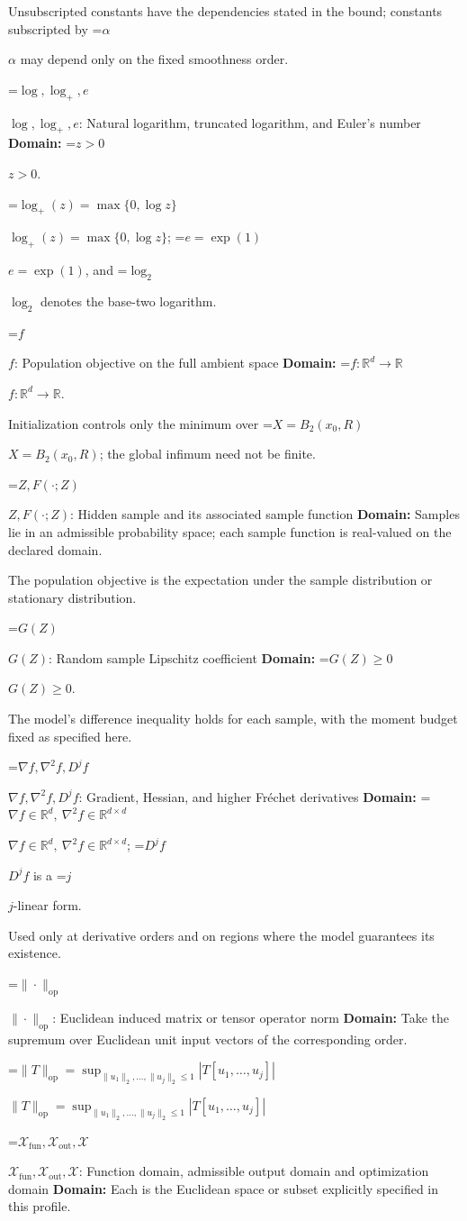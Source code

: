 \documentclass[10pt,a4paper]{article}
\newcommand{\AtlasMath}[1]{\par\begingroup\centering\setbox0=\hbox{$\displaystyle #1$}\ifdim\wd0>1.4\linewidth\typeout{ATLAS WIDE FORMULA: \the\wd0}\fi\ifdim\wd0>\linewidth\resizebox{\linewidth}{!}{\box0}\else\box0\fi\par\endgroup}
\newcommand{\AtlasInlineMath}[1]{\begingroup\setbox0=\hbox{$#1$}\ifdim\wd0>.4\linewidth\endgroup\AtlasMath{#1}\else\endgroup$#1$\fi}
\begin{document}
Unsubscripted constants have the dependencies stated in the bound; constants subscripted by \AtlasInlineMath{\alpha} may depend only on the fixed smoothness order.

\AtlasInlineMath{\log,\log_+,e}: Natural logarithm, truncated logarithm, and Euler's number \textbf{Domain:} \AtlasInlineMath{z>0}.

\AtlasInlineMath{\log_+(z)=\max\{0,\log z\}}; \AtlasInlineMath{e=\exp(1)}, and \AtlasInlineMath{\log_2} denotes the base-two logarithm.

\AtlasInlineMath{f}: Population objective on the full ambient space \textbf{Domain:} \AtlasInlineMath{f:\mathbb{R}^d\to\mathbb{R}}.

Initialization controls only the minimum over \AtlasInlineMath{X=B_2(x_0,R)}; the global infimum need not be finite.

\AtlasInlineMath{Z,F(\cdot;Z)}: Hidden sample and its associated sample function \textbf{Domain:} Samples lie in an admissible probability space; each sample function is real-valued on the declared domain.

The population objective is the expectation under the sample distribution or stationary distribution.

\AtlasInlineMath{G(Z)}: Random sample Lipschitz coefficient \textbf{Domain:} \AtlasInlineMath{G(Z)\ge0}.

The model's difference inequality holds for each sample, with the moment budget fixed as specified here.

\AtlasInlineMath{\nabla f,\nabla^2f,D^jf}: Gradient, Hessian, and higher Fréchet derivatives \textbf{Domain:} \AtlasInlineMath{\nabla f\in\mathbb{R}^d,\ \nabla^2f\in\mathbb{R}^{d\times d}}; \AtlasInlineMath{D^jf} is a \AtlasInlineMath{j}-linear form.

Used only at derivative orders and on regions where the model guarantees its existence.

\AtlasInlineMath{\|\cdot\|_{\mathrm{op}}}: Euclidean induced matrix or tensor operator norm \textbf{Domain:} Take the supremum over Euclidean unit input vectors of the corresponding order.

\AtlasInlineMath{\|T\|_{\mathrm{op}}=\sup_{\|u_1\|_2,\ldots,\|u_j\|_2\le1}|T[u_1,\ldots,u_j]|}

\AtlasInlineMath{\mathcal{X}_{\mathrm{fun}},\mathcal{X}_{\mathrm{out}},\mathcal{X}}: Function domain, admissible output domain and optimization domain \textbf{Domain:} Each is the Euclidean space or subset explicitly specified in this profile.
\end{document}

